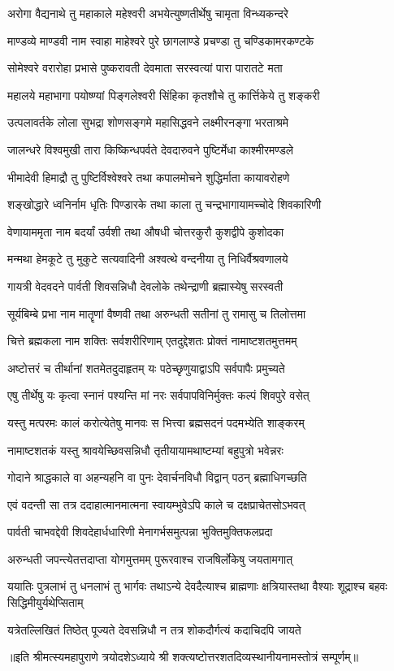 \twolineshloka
{अरोगा वैद्यनाथे तु महाकाले महेश्वरी}
{अभयेत्युष्णतीर्थेषु चामृता विन्ध्यकन्दरे}

\twolineshloka
{माण्डव्ये माण्डवी नाम स्वाहा माहेश्वरे पुरे}
{छागलाण्डे प्रचण्डा तु चण्डिकामरकण्टके}

\twolineshloka
{सोमेश्वरे वरारोहा प्रभासे पुष्करावती}
{देवमाता सरस्वत्यां पारा पारातटे मता}

\twolineshloka
{महालये महाभागा पयोष्ण्यां पिङ्गलेश्वरी}
{सिंहिका कृतशौचे तु कार्त्तिकेये तु शङ्करी}

\twolineshloka
{उत्पलावर्तके लोला सुभद्रा शोणसङ्गमे}
{महासिद्धवने लक्ष्मीरनङ्गा भरताश्रमे}

\twolineshloka
{जालन्धरे विश्वमुखी तारा किष्किन्धपर्वते}
{देवदारुवने पुष्टिर्मेधा काश्मीरमण्डले}

\twolineshloka
{भीमादेवी हिमाद्रौ तु पुष्टिर्विश्वेश्वरे तथा}
{कपालमोचने शुद्धिर्माता कायावरोहणे}

\twolineshloka
{शङ्खोद्धारे ध्वनिर्नाम धृतिः पिण्डारके तथा}
{काला तु चन्द्रभागायामच्चोदे शिवकारिणी}

\twolineshloka
{वेणायाममृता नाम बदर्यां उर्वशी तथा}
{औषधी चोत्तरकुरौ कुशद्वीपे कुशोदका}

\twolineshloka
{मन्मथा हेमकूटे तु मुकुटे सत्यवादिनी}
{अश्वत्थे वन्दनीया तु निधिर्वैश्रवणालये}

\twolineshloka
{गायत्री वेदवदने पार्वती शिवसन्निधौ}
{देवलोके तथेन्द्राणी ब्रह्मास्येषु सरस्वती}

\twolineshloka
{सूर्यबिम्बे प्रभा नाम मातॄणां वैष्णवी तथा}
{अरुन्धती सतीनां तु रामासु च तिलोत्तमा}

\twolineshloka
{चित्ते ब्रह्मकला नाम शक्तिः सर्वशरीरिणाम्}
{एतदुद्देशतः प्रोक्तं नामाष्टशतमुत्तमम्}

\twolineshloka
{अष्टोत्तरं च तीर्थानां शतमेतदुदाहृतम्}
{यः पठेच्छृणुयाद्वाऽपि सर्वपापैः प्रमुच्यते}

\twolineshloka
{एषु तीर्थेषु यः कृत्वा स्नानं पश्यन्ति मां नरः}
{सर्वपापविनिर्मुक्तः कल्पं शिवपुरे वसेत्}

\twolineshloka
{यस्तु मत्परमः कालं करोत्येतेषु मानवः}
{स भित्त्वा ब्रह्मसदनं पदमभ्येति शाङ्करम्}

\twolineshloka
{नामाष्टशतकं यस्तु श्रावयेच्छिवसन्निधौ}
{तृतीयायामथाष्टम्यां बहुपुत्रो भवेन्नरः}

\twolineshloka
{गोदाने श्राद्धकाले वा अहन्यहनि वा पुनः}
{देवार्चनविधौ विद्वान् पठन् ब्रह्माधिगच्छति}

\twolineshloka
{एवं वदन्ती सा तत्र ददाहात्मानमात्मना}
{स्वायम्भुवेऽपि काले च दक्षप्राचेतसोऽभवत्}

\twolineshloka
{पार्वती चाभवद्देवी शिवदेहार्धधारिणी}
{मेनागर्भसमुत्पन्ना भुक्तिमुक्तिफलप्रदा}

\twolineshloka
{अरुन्धती जपन्त्येतत्तदाप्ता योगमुत्तमम्}
{पुरूरवाश्च राजषिर्लोकेषु जयतामगात्}

\threelineshloka
{ययातिः पुत्रलाभं तु धनलाभं तु भार्गवः}
{तथाऽन्ये देवदैत्याश्च ब्राह्मणाः क्षत्रियास्तथा}
{वैश्याः शूद्राश्च बहवः सिद्धिमीयुर्यथेप्सिताम्}

\twolineshloka
{यत्रेतल्लिखितं तिष्ठेत् पूज्यते देवसन्निधौ}
{न तत्र शोकदौर्गत्यं कदाचिदपि जायते}

॥इति श्रीमत्स्यमहापुराणे त्रयोदशेऽध्याये श्री शक्त्यष्टोत्तरशतदिव्यस्थानीयनामस्तोत्रं सम्पूर्णम्॥